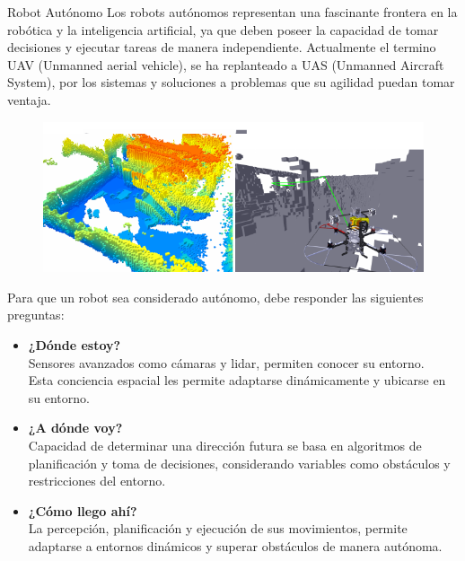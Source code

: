 \documentclass[final]{beamer}
\newlength{\colwidth}
\begin{document}
\begin{frame}[t]
\begin{columns}[t]
\begin{column}{\colwidth}
  \begin{block}{\color{teal}Robot Autónomo}
    Los robots autónomos representan una fascinante frontera en la robótica y la inteligencia artificial, ya que deben poseer la capacidad de tomar decisiones y ejecutar tareas de manera independiente.
    Actualmente el termino UAV (Unmanned aerial vehicle), se ha replanteado a UAS (Unmanned Aircraft System), por los sistemas y soluciones a problemas que su agilidad puedan tomar ventaja.
    \begin{figure}
      \centering
      \includegraphics[width=35cm]{images/auto_dro.png}
    \end{figure}

    Para que un robot sea considerado autónomo, debe responder las siguientes preguntas:
    \begin{multicols}{3}
      \begin{itemize}
      \item \textbf{¿Dónde estoy?}\\
        Sensores avanzados como cámaras y lidar, permiten conocer su entorno.\\
        Esta conciencia espacial les permite adaptarse dinámicamente y ubicarse en su entorno.\vspace{1cm}
      \item \textbf{¿A dónde voy?}\\
        Capacidad de determinar una dirección futura se basa en algoritmos de planificación y toma de decisiones, considerando variables como obstáculos y restricciones del entorno.\vspace{1cm}
      \item \textbf{¿Cómo llego ahí?}\\
        La percepción, planificación y ejecución de sus movimientos, permite adaptarse a entornos dinámicos y superar obstáculos de manera autónoma.
      \end{itemize}
    \end{multicols}
  \end{block}
\end{column}


\end{columns}
\end{frame}
\end{document}
